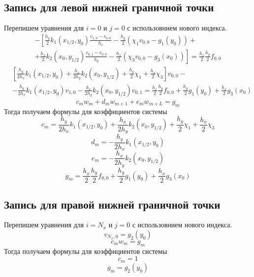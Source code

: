 \subsection{Запись для левой нижней граничной точки}
Перепишем уравнения для $i = 0$ и $j = 0$ с использовнием нового индекса.
\begin{multline*}
    - \left[
    \frac{h_y}{2} k_1(x_{1/2},y_{0}) \frac{v_{1,0} - v_{0,0}}{h_x} - \frac{h_y}{2} \left( \chi_1 v_{0,0} - g_1(y_{0}) \right) + \right. \\
    \left. +
    \frac{h_x}{2} k_2(x_{0},y_{1/2}) \frac{v_{0,1} - v_{0,0}}{h_y} - \frac{h_x}{2} \left( \chi_3 v_{0,0} - g_3(x_{0}) \right)
    \right] =
    \frac{h_x}{2} \frac{h_y}{2} f_{0,0}
\end{multline*}
\[
\begin{split}
    &\left[ \frac{h_y}{2 h_x} k_1(x_{1/2},y_{0}) + \frac{h_x}{2 h_y} k_2(x_{0},y_{1/2}) + \frac{h_y}{2} \chi_1 + \frac{h_x}{2} \chi_3 \right] v_{0,0} - \\
    &-\frac{h_y}{2 h_x} k_1(x_{1/2},y_{0}) v_{1,0} - \frac{h_x}{2 h_y} k_2(x_{0},y_{1/2}) v_{0,1} = \frac{h_x}{2} \frac{h_y}{2} f_{0,0} + \frac{h_y}{2} g_1(y_0) + \frac{h_x}{2} g_3(x_0)
\end{split}
\]
\[ c_m w_m + d_m w_{m + 1} + e_m w_{m + L} = g_m \]
Тогда получаем формулы для коэффициентов системы
\[ c_m = \frac{h_y}{2 h_x} k_1(x_{1/2},y_{0}) + \frac{h_x}{2 h_y} k_2(x_{0},y_{1/2}) + \frac{h_y}{2} \chi_1 + \frac{h_x}{2} \chi_3 \]
\[ d_m = -\frac{h_y}{2 h_x} k_1(x_{1/2},y_{0}) \]
\[ e_m = -\frac{h_x}{2 h_y} k_2(x_{0},y_{1/2}) \]
\[ g_m = \frac{h_x}{2} \frac{h_y}{2} f_{0,0} + \frac{h_y}{2} g_1(y_0) + \frac{h_x}{2} g_3(x_0) \]

\subsection{Запись для правой нижней граничной точки}
Перепишем уравнения для $i = N_x$ и $j = 0$ с использовнием нового индекса.
\[ v_{N_x,0} = g_2(y_0) \]
\[ c_m w_m = g_m \]
Тогда получаем формулы для коэффициентов системы
\[ c_m = 1 \]
\[ g_m = g_2(y_0) \]

